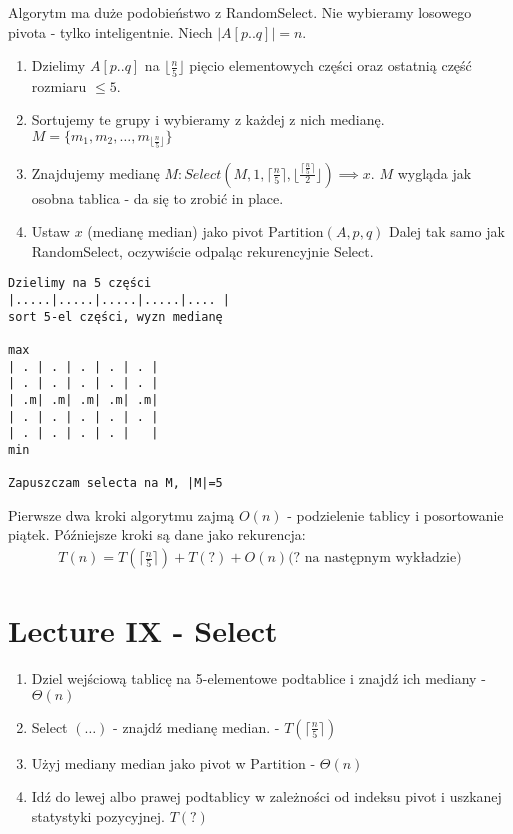 \documentclass{article}
\numberwithin{equation}{subsection}
\begin{document}
Algorytm ma duże podobieństwo z RandomSelect. Nie wybieramy losowego pivota - tylko inteligentnie.
Niech $|A[p..q]|=n$.
\begin{enumerate}
    \item Dzielimy $A[p..q]$ na $\lfloor \frac{n}{5} \rfloor$ pięcio elementowych części oraz ostatnią część rozmiaru $\leq 5$.
    \item Sortujemy te grupy i wybieramy z każdej z nich medianę. $M=\{m_1,m_2,\dots,m_{\lfloor\frac{n}{5}\rfloor}\}$
    \item Znajdujemy medianę $M: Select(M,1,\lceil \frac{n}{5} \rceil, \lfloor \frac{\lceil \frac{n}{5} \rceil}{2} \rfloor) \implies x$.
    $M$ wygląda jak osobna tablica - da się to zrobić in place.
    \item Ustaw $x$ (medianę median) jako pivot $\text{Partition}(A,p,q)$
    Dalej tak samo jak RandomSelect, oczywiście odpaląc rekurencyjnie Select.
\end{enumerate}

\begin{verbatim}
Dzielimy na 5 części
|.....|.....|.....|.....|.... |
sort 5-el części, wyzn medianę

max
| . | . | . | . | . |
| . | . | . | . | . |
| .m| .m| .m| .m| .m|
| . | . | . | . | . |
| . | . | . | . |   |
min

Zapuszczam selecta na M, |M|=5
\end{verbatim}
Pierwsze dwa kroki algorytmu zajmą $O(n)$ - podzielenie tablicy i posortowanie piątek. 
Późniejsze kroki są dane jako rekurencja:
\begin{align}
    T(n) = T\left(\lceil \frac{n}{5} \rceil\right) + T(?) + O(n) \text{(? na następnym wykładzie)}
\end{align}

\section{Lecture IX - Select}

\begin{enumerate}
    \item Dziel wejściową tablicę na 5-elementowe podtablice i znajdź ich mediany - $\Theta(n)$
    \item Select $(\dots)$ - znajdź medianę median. - $T\left(\lceil \frac{n}{5} \rceil\right)$
    \item Użyj mediany median jako pivot w $\text{Partition}$ - $\Theta(n)$
    \item Idź do lewej albo prawej podtablicy w zależności od indeksu pivot i uszkanej statystyki pozycyjnej. $T(?)$
\end{enumerate}
\end{document}
